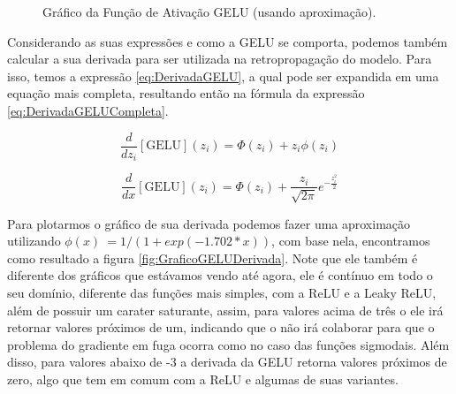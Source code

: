 \begin{figure}[htbp]
    \centering
    \caption{Gráfico da Função de Ativação GELU (usando aproximação).}
    \label{fig:GraficoGELU}
\end{figure}

Considerando as suas expressões e como a GELU se comporta, podemos também calcular a sua derivada para ser utilizada na retropropagação do modelo. Para isso, temos a expressão \ref{eq:DerivadaGELU}, a qual pode ser expandida em uma equação mais completa, resultando então na fórmula da expressão \ref{eq:DerivadaGELUCompleta}.

\begin{equation}
    \frac{d}{dz_i} [\text{GELU}](z_i) = \Phi(z_i) + z_i\phi(z_i)
    \label{eq:DerivadaGELU}
\end{equation}

\begin{equation}
    \frac{d}{dx} [\text{GELU}](z_i) = \Phi(z_i) + \frac{z_i}{\sqrt{2\pi}} e^{-\frac{z_i^2}{2}}
    \label{eq:DerivadaGELUCompleta}
\end{equation}

Para plotarmos o gráfico de sua derivada podemos fazer uma aproximação utilizando $\phi(x) ~= 1/(1+exp(-1.702*x))$, com base nela, encontramos como resultado a figura \ref{fig:GraficoGELUDerivada}. Note que ele também é diferente dos gráficos que estávamos vendo até agora, ele é contínuo em todo o seu domínio, diferente das funções mais simples, com a ReLU e a Leaky ReLU, além de possuir um carater saturante, assim, para valores acima de três o ele irá retornar valores próximos de um, indicando que o não irá colaborar para que o problema do gradiente em fuga ocorra como no caso das funções sigmodais. Além disso, para valores abaixo de -3 a derivada da GELU retorna valores próximos de zero, algo que tem em comum com a ReLU e algumas de suas variantes.

